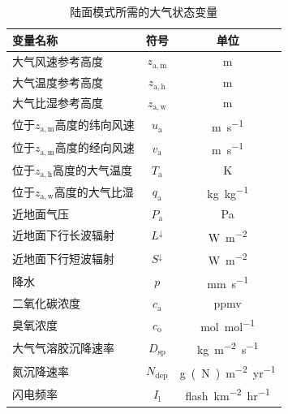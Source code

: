 {
  \begin{table}[htbp]
    \centering
    \caption{陆面模式所需的大气状态变量}
    \label{tab:陆面模式所需的大气状态变量}
    \begin{threeparttable}
      \begin{tabular}{lcc}
        \toprule
        变量名称                             & 符号               & 单位                         \\ \midrule
        大气风速参考高度                     & $z_{\mathrm{a,m}}$ & m                            \\
        大气温度参考高度                     & $z_{\mathrm{a,h}}$ & m                            \\
        大气比湿参考高度                     & $z_{\mathrm{a,w}}$ & m                            \\
        位于$z_{\mathrm{a,m}}$高度的纬向风速 & $u_{\mathrm{a}}$   & \unit{m.s^{-1}}              \\
        位于$z_{\mathrm{a,m}}$高度的经向风速 & $v_{\mathrm{a}}$   & \unit{m.s^{-1}}              \\
        位于$z_{\mathrm{a,h}}$高度的大气温度 & $T_{\mathrm{a}}$   & K                            \\
        位于$z_{\mathrm{a,w}}$高度的大气比湿 & $q_{\mathrm{a}}$   & \unit{kg.kg^{-1}}            \\
        近地面气压                           & $P_{\mathrm{a}}$   & Pa                           \\
        近地面下行长波辐射                   & $L ^\downarrow$    & \unit{W.m^{-2}}              \\
        近地面下行短波辐射                   & $S ^\downarrow$    & \unit{W.m^{-2}}              \\
        降水                                 & $p$                & \unit{mm.s^{-1}}             \\
        二氧化碳浓度                         & $c_{\mathrm {a}}$  & ppmv                         \\
        臭氧浓度                             & $c_{\mathrm {o}}$  & \unit{mol.mol^{-1}}          \\
        大气气溶胶沉降速率                   & $D_{\mathrm{sp}}$  & \unit{kg.m^{-2}.s^{-1}}      \\
        氮沉降速率                           & $N_{\mathrm{dep}}$ & \unit{g(N).m^{-2}.yr^{-1}}   \\
        闪电频率                             & $I_{\mathrm {l}}$  & \unit{flash.km^{-2}.hr^{-1}} \\ \bottomrule

\end{tabular}
\end{threeparttable}
\end{table}}

